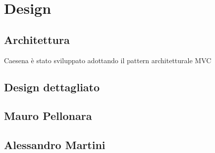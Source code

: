 \section{Design}
\subsection{Architettura}
Caesena è stato sviluppato adottando il pattern architetturale MVC 
\subsection{Design dettagliato}

\subsection*{Mauro Pellonara} 

\subsection*{Alessandro Martini}
